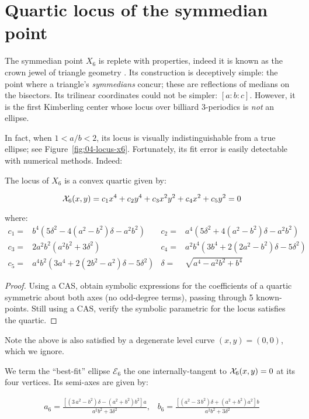 
\section{Quartic locus of the symmedian point }
\label{sec:symmedian}

The symmedian point $X_6$ is replete with properties, indeed it is known as the crown jewel of triangle geometry \cite[Symmedian Point]{mw}. Its construction is deceptively simple: the point where a triangle's {\em symmedians} concur; these are reflections of medians on the bisectors. Its trilinear coordinates could not be simpler: $[a:b:c]$. However, it is the first Kimberling center whose locus over billiard 3-periodics is {\em not} an ellipse. 

In fact, when $1<a/b<2$, its locus is visually indistinguishable from a true ellipse; see Figure~\ref{fig:04-locus-x6}. Fortunately, its fit error is easily detectable with numerical methods. Indeed:

\begin{proposition}
The locus of $X_6$ is a convex quartic given by:

\begin{equation*}
  \mathcal{X}_6(x,y)=c_1 x^4+c_2 y^4+c_3 x^2 y^2+ c_4 x^2 + c_5 y^2 = 0
\end{equation*}

\noindent where:
$$
\begin{array}{rlrl}
c_1=&b^4(5\delta^2-4(a^2-b^2)\delta -a^2 b^2)&c_2=&a^4(5\delta^2+4(a^2-b^2)\delta-a^2b^2) \\
c_3=&2a^2 b^2(a^2 b^2+3\delta^2)&c_4=&a^2 b^4(3 b^4+2(2 a^2-b^2)\delta-5\delta^2)\\
c_5=&a^4 b^2(3 a^4+2(2 b^2-a^2)\delta-5\delta^2)&\delta=&\sqrt{a^4-a^2 b^2+b^4}
\end{array}
$$
\end{proposition}

\begin{proof}
Using a CAS, obtain symbolic expressions for the coefficients of a quartic symmetric about both axes (no odd-degree terms), passing through 5 known-points. Still using a CAS, verify the symbolic parametric for the locus satisfies the quartic.
\end{proof}

 \noindent Note the above is also satisfied by a degenerate level curve $(x,y)=(0,0)$, which we ignore.

\begin{remark}
We term the ``best-fit'' ellipse $\mathcal{E}_6$ the one internally-tangent to $\mathcal{X}_6(x,y)=0$ at its four vertices. Its semi-axes are given by: 

{\small  
\begin{align*}
a_6= \frac{\left[(3\,a^2-b^2)\delta -(a^2+b^2)b^2\right]a}{a^2b^2+3\delta^2},\;\;\;
b_6= \frac{\left[(a^2-3\,b^2)\delta + (a^2+b^2)a^2\right]b}{a^2b^2+3\delta^2}
\label{eqn:x6-ellipse}
\end{align*}
}
\end{remark}

